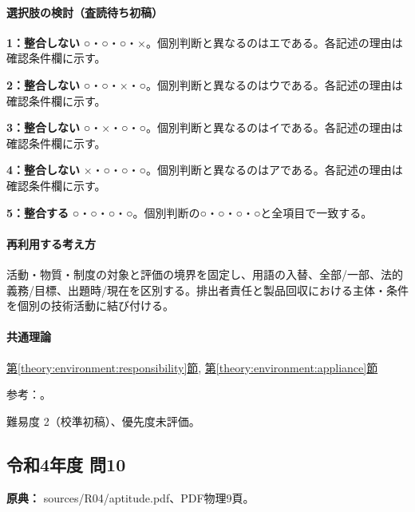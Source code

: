\paragraph{選択肢の検討（査読待ち初稿）}\mbox{}\par

\noindent\textbf{1：整合しない} ○・○・○・×。個別判断と異なるのはエである。各記述の理由は確認条件欄に示す。\par

\noindent\textbf{2：整合しない} ○・○・×・○。個別判断と異なるのはウである。各記述の理由は確認条件欄に示す。\par

\noindent\textbf{3：整合しない} ○・×・○・○。個別判断と異なるのはイである。各記述の理由は確認条件欄に示す。\par

\noindent\textbf{4：整合しない} ×・○・○・○。個別判断と異なるのはアである。各記述の理由は確認条件欄に示す。\par

\noindent\textbf{5：整合する} ○・○・○・○。個別判断の○・○・○・○と全項目で一致する。\par

\paragraph{再利用する考え方} 活動・物質・制度の対象と評価の境界を固定し、用語の入替、全部/一部、法的義務/目標、出題時/現在を区別する。排出者責任と製品回収における主体・条件を個別の技術活動に結び付ける。

\paragraph{共通理論} \hyperref[theory:environment:responsibility]{第\ref*{theory:environment:responsibility}節}, \hyperref[theory:environment:appliance]{第\ref*{theory:environment:appliance}節}

\par 参考：\cite{env_circular_law,env_waste2003,env_appliance,env_appliance2024}。

\par 難易度 2（校準初稿）、優先度未評価。

\subsection{令和4年度 問10}
\label{q:r04-reg-apt-10}

\noindent\textbf{原典：} sources/R04/aptitude.pdf、PDF物理9頁。


